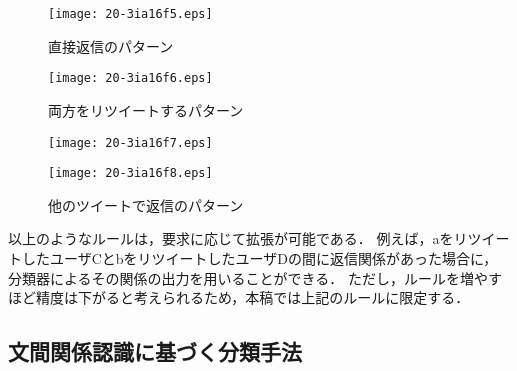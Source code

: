\documentclass[japanese]{jnlp_1.4}
\begin{document}
\begin{figure}[t]
 \begin{minipage}[t]{0.45\textwidth}
  \begin{center}
   \texttt{[image: 20-3ia16f5.eps]}
  \end{center}
  \caption{直接返信のパターン}
  \label{fig:direct_repqt}
 \end{minipage}
\hfill
 \begin{minipage}[t]{0.45\textwidth}
  \begin{center}
   \texttt{[image: 20-3ia16f6.eps]}
  \end{center}
  \caption{両方をリツイートするパターン}
  \label{fig:both_RT}
 \end{minipage}
\end{figure}
\begin{figure}[t]
\setlength{\captionwidth}{0.45\textwidth}
 \begin{minipage}[t]{0.45\textwidth}
  \begin{center}
   \texttt{[image: 20-3ia16f7.eps]}
  \end{center}
  \caption{他のツイートで返信のパターン}
  \label{fig:other_repqt}
 \end{minipage}
\hfill
 \begin{minipage}[t]{0.45\textwidth}
  \begin{center}
   \texttt{[image: 20-3ia16f8.eps]}
  \end{center}
  \label{fig:RT_and_repqt}
 \end{minipage}
\end{figure}

以上のようなルールは，要求に応じて拡張が可能である．
例えば，aをリツイートしたユーザCとbをリツイートしたユーザDの間に返信関係があった場合に，
分類器によるその関係の出力を用いることができる．
ただし，ルールを増やすほど精度は下がると考えられるため，本稿では上記のルールに限定する．



\subsection{文間関係認識に基づく分類手法}
\end{document}
